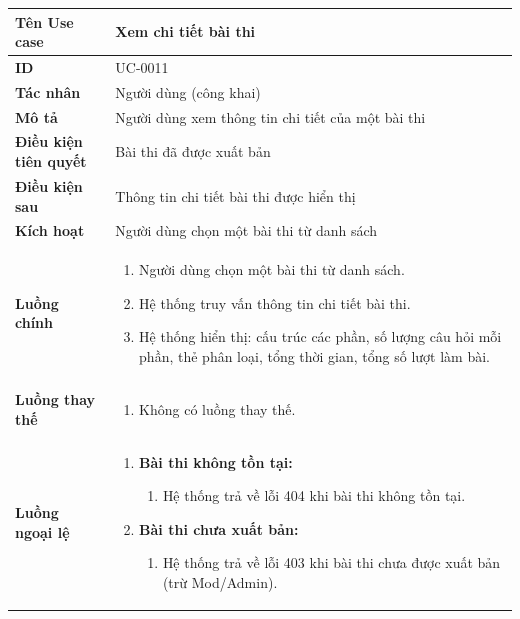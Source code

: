 {
\renewcommand{\arraystretch}{1.5}

\begin{tabularx}{\textwidth}{|>{\raggedright\arraybackslash}X|>{\raggedright\arraybackslash}X|}
\hline
\textbf{Tên Use case} & Xem chi tiết bài thi \\
\hline
\textbf{ID} & UC-0011 \\
\hline
\textbf{Tác nhân} & Người dùng (công khai) \\
\hline
\textbf{Mô tả} & Người dùng xem thông tin chi tiết của một bài thi \\
\hline
\textbf{Điều kiện tiên quyết} & Bài thi đã được xuất bản \\
\hline
\textbf{Điều kiện sau} & Thông tin chi tiết bài thi được hiển thị \\
\hline
\textbf{Kích hoạt} & Người dùng chọn một bài thi từ danh sách \\
\hline
\textbf{Luồng chính} &
\begin{enumerate}
    \item Người dùng chọn một bài thi từ danh sách.
    \item Hệ thống truy vấn thông tin chi tiết bài thi.
    \item Hệ thống hiển thị: cấu trúc các phần, số lượng câu hỏi mỗi phần, thẻ phân loại, tổng thời gian, tổng số lượt làm bài.
\end{enumerate} \\
\hline
\textbf{Luồng thay thế} &
\begin{enumerate}
    \item Không có luồng thay thế.
\end{enumerate} \\
\hline
\textbf{Luồng ngoại lệ} &
\begin{enumerate}
    \item \textbf{Bài thi không tồn tại:}
    \begin{enumerate}
        \item[2Err.] Hệ thống trả về lỗi 404 khi bài thi không tồn tại.
    \end{enumerate}
    \item \textbf{Bài thi chưa xuất bản:}
    \begin{enumerate}
        \item[2Err2.] Hệ thống trả về lỗi 403 khi bài thi chưa được xuất bản (trừ Mod/Admin).
    \end{enumerate}
\end{enumerate} \\
\hline
\end{tabularx}
}
